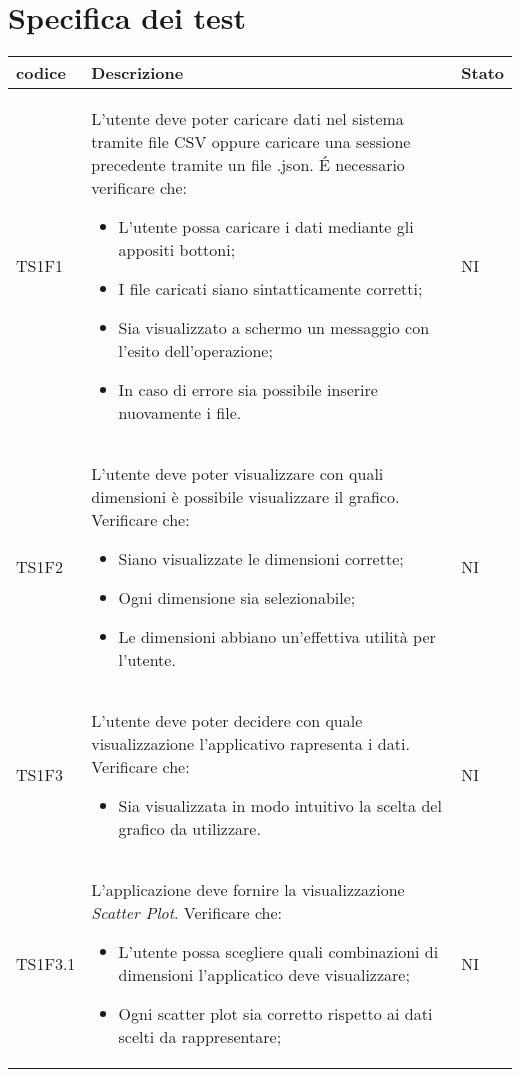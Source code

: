 \section{Specifica dei test}
    \begin{tabular}{|p{2cm}|p{4cm}|p{4cm}|} \hline
      \textbf{codice} & \textbf{Descrizione} & \textbf{Stato} \\ \hline
        TS1F1 & L'utente deve poter caricare dati nel sistema tramite file CSV oppure caricare una sessione precedente tramite un file .json. \'E necessario verificare che: \begin{itemize}
            \item L'utente possa caricare i dati mediante gli appositi bottoni;
            \item I file caricati siano sintatticamente corretti;
            \item Sia visualizzato a schermo un messaggio con l'esito dell'operazione;
            \item In caso di errore sia possibile inserire nuovamente i file.
        \end{itemize} & NI\\ \hline
        
        TS1F2 & L'utente deve poter visualizzare con quali dimensioni è possibile visualizzare il grafico. Verificare che: \begin{itemize}
            \item Siano visualizzate le dimensioni corrette;
            \item Ogni dimensione sia selezionabile;
            \item Le dimensioni abbiano un'effettiva utilità per l'utente.
        \end{itemize} & NI\\ \hline

        TS1F3 & L'utente deve poter decidere con quale visualizzazione l'applicativo rapresenta i dati. Verificare che: \begin{itemize}
            \item Sia visualizzata in modo intuitivo la scelta del grafico da utilizzare.
        \end{itemize} & NI\\ \hline

        TS1F3.1 & L'applicazione deve fornire la visualizzazione  \textit{Scatter Plot}. Verificare che: \begin{itemize}
            \item L'utente possa scegliere quali combinazioni di dimensioni l'applicatico deve visualizzare;
            \item Ogni scatter plot sia corretto rispetto ai dati scelti da rappresentare;
        \end{itemize} & NI\\ \hline


\end{tabular}
